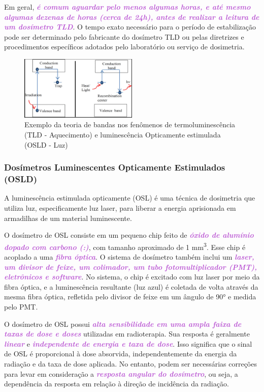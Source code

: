 \documentclass[11pt,a4paper]{article}
\begin{document}
		Em geral, \textcolor{MediumOrchid}{\textit{\textbf{é comum aguardar pelo menos algumas horas, e até mesmo algumas dezenas de horas (cerca de 24h), antes de realizar a leitura de um dosímetro TLD}}}. O tempo exato necessário para o período de estabilização pode ser determinado pelo fabricante do dosímetro TLD ou pelas diretrizes e procedimentos específicos adotados pelo laboratório ou serviço de dosimetria.

		\begin{figure}[h]
			\centering
			\includegraphics[width=0.5\textwidth]{Imagens/tldOsld.jpg}
			\caption{Exemplo da teoria de bandas nos fenômenos de termoluminescência (TLD - Aquecimento) e luminescência Opticamente estimulada (OSLD - Luz)}
			\label{fig:tldOsld}
		\end{figure}

\subsubsection*{Dosímetros Luminescentes Opticamente Estimulados (OSLD)}

	A luminescência estimulada opticamente (OSL) é uma técnica de dosimetria que utiliza luz, especificamente luz laser, para liberar a energia aprisionada em armadilhas de um material luminescente. 

	O dosímetro de OSL consiste em um pequeno chip feito de \textcolor{MediumOrchid}{\textit{\textbf{óxido de alumínio dopado com carbono (:)}}}, com tamanho aproximado de 1 \unit{mm^3}. Esse chip é acoplado a uma \textcolor{MediumOrchid}{\textit{\textbf{fibra óptica}}}. O sistema de dosímetro também inclui um \textcolor{MediumOrchid}{\textit{\textbf{laser, um divisor de feixe, um colimador, um tubo fotomultiplicador (PMT), eletrônicos e software}}}. No sistema, o chip é excitado com luz laser por meio da fibra óptica, e a luminescência resultante (luz azul) é coletada de volta através da mesma fibra óptica, refletida pelo divisor de feixe em um ângulo de \ang{90} e medida pelo PMT.

	O dosímetro de OSL possui \textcolor{MediumOrchid}{\textit{\textbf{alta sensibilidade em uma ampla faixa de taxas de dose e doses}}} utilizadas em radioterapia. Sua resposta é geralmente \textcolor{MediumOrchid}{\textit{\textbf{linear}}} e \textcolor{MediumOrchid}{\textit{\textbf{independente de energia e taxa de dose}}}. Isso significa que o sinal de OSL é proporcional à dose absorvida, independentemente da energia da radiação e da taxa de dose aplicada. No entanto, podem ser necessárias correções para levar em consideração a \textcolor{MediumOrchid}{\textit{\textbf{resposta angular do dosímetro}}}, ou seja, a dependência da resposta em relação à direção de incidência da radiação.
\end{document}
